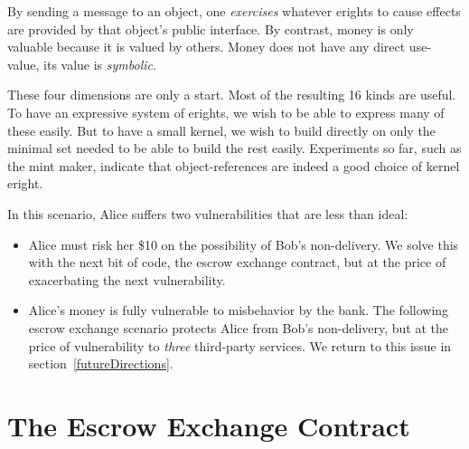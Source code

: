 \documentclass{llncs}
\begin{document}
By sending a message to an object, one \emph{exercises} whatever erights to cause effects are provided by that object's public interface. By contrast, money is only valuable because it is valued by others. Money does not have any direct use-value, its value is \emph{symbolic}.

These four dimensions are only a start. Most of the resulting 16 kinds are useful. To have an expressive system of erights, we wish to be able to express many of these easily. But to have a small kernel, we wish to build directly on only the minimal set needed to be able to build the rest easily. Experiments so far, such as the mint maker, indicate that object-references are indeed a good choice of kernel eright.

In this scenario, Alice suffers two vulnerabilities that are less than ideal:
\begin{itemize}
\item Alice must risk her \$10 on the possibility of Bob's non-delivery. We solve this with the next bit of code, the escrow exchange contract, but at the price of exacerbating the next vulnerability.
\item Alice's money is fully vulnerable to misbehavior by the bank. The following escrow exchange scenario protects Alice from Bob's non-delivery, but at the price of vulnerability to \emph{three} third-party services. We return to this issue in section~\ref{futureDirections}.
\end{itemize}



\section{The Escrow Exchange Contract}
\end{document}
